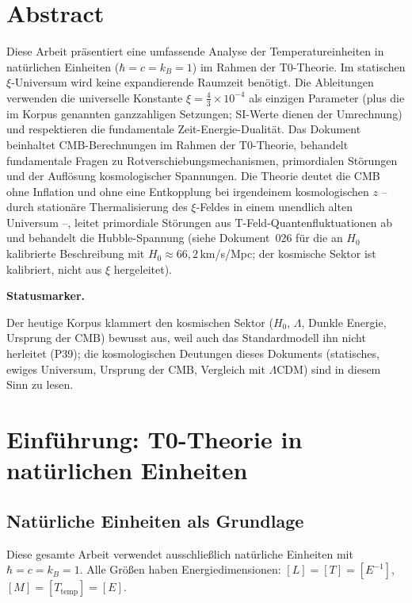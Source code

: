\section*{Abstract}
		Diese Arbeit präsentiert eine umfassende Analyse der Temperatureinheiten in natürlichen Einheiten ($\hbar = c = k_B = 1$) im Rahmen der T0-Theorie. Im statischen $\xi$-Universum wird keine expandierende Raumzeit benötigt. Die Ableitungen verwenden die universelle Konstante $\xi = \frac{4}{3} \times 10^{-4}$ als einzigen Parameter (plus die im Korpus genannten ganzzahligen Setzungen; SI-Werte dienen der Umrechnung) und respektieren die fundamentale Zeit-Energie-Dualität. Das Dokument beinhaltet CMB-Berechnungen im Rahmen der T0-Theorie, behandelt fundamentale Fragen zu Rotverschiebungsmechanismen, primordialen Störungen und der Auflösung kosmologischer Spannungen. Die Theorie deutet die CMB ohne Inflation und ohne eine Entkopplung bei irgendeinem kosmologischen $z$ -- durch stationäre Thermalisierung des $\xi$-Feldes in einem unendlich alten Universum --, leitet primordiale Störungen aus T-Feld-Quantenfluktuationen ab und behandelt die Hubble-Spannung (siehe Dokument~026 für die an $H_0$ kalibrierte Beschreibung mit $H_0 \approx 66{,}2\,$km/s/Mpc; der kosmische Sektor ist kalibriert, nicht aus $\xi$ hergeleitet).

	\medskip\noindent\textbf{Statusmarker.}
	

	\noindent Der heutige Korpus klammert den kosmischen Sektor ($H_0$, $\Lambda$, Dunkle Energie, Ursprung der CMB) bewusst aus, weil auch das Standardmodell ihn nicht herleitet (P39); die kosmologischen Deutungen dieses Dokuments (statisches, ewiges Universum, Ursprung der CMB, Vergleich mit $\Lambda$CDM) sind in diesem Sinn zu lesen.

	
	
	\section{Einführung: T0-Theorie in natürlichen Einheiten}
	
	\subsection{Natürliche Einheiten als Grundlage}
	
	\begin{important}
		Diese gesamte Arbeit verwendet ausschließ{}lich natürliche Einheiten mit $\hbar = c = k_B = 1$. Alle Größ{}en haben Energiedimensionen: $[L] = [T] = [E^{-1}]$, $[M] = [T_{\text{temp}}] = [E]$.
	\end{important}
	
